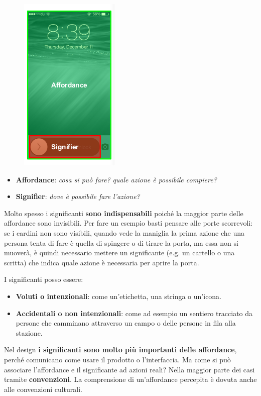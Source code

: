 \begin{figure}[!h]
	\centering
	\includegraphics[scale = 0.7]{"immagini/Affordance vs Signifier"}
\end{figure}
\begin{itemize}
	\item \textbf{Affordance}: \textit{cosa si può fare?} \textit{quale azione è possibile compiere?}
	\item \textbf{Signifier}: \textit{dove è possibile fare l'azione?}
\end{itemize}
Molto spesso i significanti \textbf{sono indispensabili} poiché la maggior parte delle affordance sono invisibili. Per fare un esempio basti pensare alle porte scorrevoli: se i cardini non sono visibili, quando vede la maniglia la prima azione che una persona tenta di fare è quella di spingere o di tirare la porta, ma essa non si muoverà, è quindi necessario mettere un significante (e.g. un cartello o una scritta) che indica quale azione è necessaria per aprire la porta.

I significanti posso essere:
\begin{itemize}
	\item \textbf{Voluti o intenzionali}: come un'etichetta, una stringa o un'icona.
	\item \textbf{Accidentali o non intenzionali}: come ad esempio un sentiero tracciato da persone che camminano attraverso un campo o delle persone in fila alla stazione.
\end{itemize}
Nel design \textbf{i significanti sono molto più importanti delle affordance}, perché comunicano come usare il prodotto o l'interfaccia. Ma come si può associare l'affordance e il significante ad azioni reali? Nella maggior parte dei casi tramite \textbf{convenzioni}. La comprensione di un'affordance percepita è dovuta anche alle convenzioni culturali.

